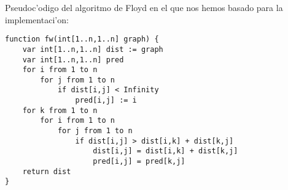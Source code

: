 Pseudoc'odigo del algoritmo de Floyd en el que nos hemos basado para la implementaci'on:
\begin{verbatim}
function fw(int[1..n,1..n] graph) {
    var int[1..n,1..n] dist := graph
    var int[1..n,1..n] pred
    for i from 1 to n
        for j from 1 to n
            if dist[i,j] < Infinity
                pred[i,j] := i
    for k from 1 to n
        for i from 1 to n
            for j from 1 to n
                if dist[i,j] > dist[i,k] + dist[k,j]
                    dist[i,j] = dist[i,k] + dist[k,j]
                    pred[i,j] = pred[k,j]
    return dist
}
\end{verbatim}